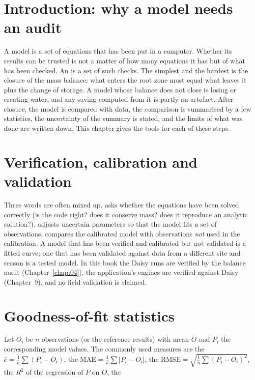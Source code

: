 \section{Introduction: why a model needs an audit}
A model is a set of equations that has been put in a computer. Whether its results can be trusted is not a matter of how many equations it has but of what has been checked. An  is a set of such checks. The simplest and the hardest is the closure of the mass balance: what enters the root zone must equal what leaves it plus the change of storage. A model whose balance does not close is losing or creating water, and any saving computed from it is partly an artefact. After closure, the model is compared with data, the comparison is summarised by a few statistics, the uncertainty of the summary is stated, and the limits of what was done are written down. This chapter gives the tools for each of these steps.

\section{Verification, calibration and validation}
Three words are often mixed up.  asks whether the equations have been solved correctly (is the code right? does it conserve mass? does it reproduce an analytic solution?).  adjusts uncertain parameters so that the model fits a set of observations.  compares the calibrated model with observations \emph{not} used in the calibration. A model that has been verified and calibrated but not validated is a fitted curve; one that has been validated against data from a different site and season is a tested model. In this book the Daisy runs are verified by the balance audit (Chapter~\ref{chap:04}), the application's engines are verified against Daisy (Chapter~9), and no field validation is claimed.

\section{Goodness-of-fit statistics}
Let $O_i$ be $n$ observations (or the reference results) with mean $\bar O$ and $P_i$ the corresponding model values. The commonly used measures are the  $\bar e=\frac1n\sum(P_i-O_i)$, the  $\mathrm{MAE}=\frac1n\sum|P_i-O_i|$, the  $\mathrm{RMSE}=\sqrt{\frac1n\sum(P_i-O_i)^2}$, the  $R^2$ of the regression of $P$ on $O$, the 

